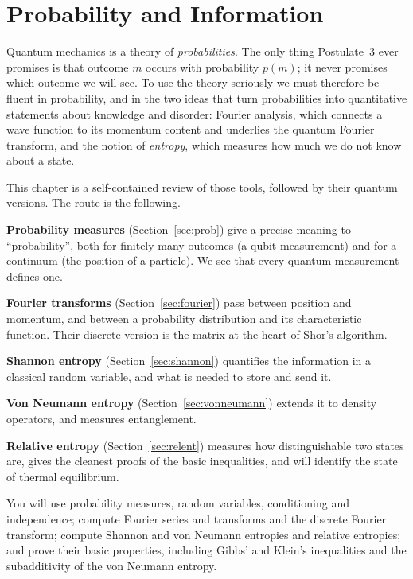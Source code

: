 \chapter{Probability and Information}\label{ch:info}

Quantum mechanics is a theory of \emph{probabilities}. The only thing Postulate~3 ever promises is that outcome $m$ occurs with probability $p(m)$; it never promises which outcome we will see. To use the theory seriously we must therefore be fluent in probability, and in the two
ideas that turn probabilities into quantitative statements about knowledge and disorder: Fourier analysis, which connects a wave function to its momentum content and underlies the quantum Fourier transform, and the notion of \emph{entropy}, which measures how much we do not know about a state.

This chapter is a self-contained review of those tools, followed by their quantum versions. The route is the following.

\begin{steps}
  \item \textbf{Probability measures} (Section~\ref{sec:prob}) give a precise meaning to ``probability'', both for finitely many outcomes (a qubit measurement) and for a continuum (the position of a particle). We see that every quantum measurement defines one.
  \item \textbf{Fourier transforms} (Section~\ref{sec:fourier}) pass between position and momentum, and between a probability distribution and its characteristic function. Their discrete version is the matrix at the heart of Shor's algorithm.
  \item \textbf{Shannon entropy} (Section~\ref{sec:shannon}) quantifies the information in a classical random variable, and what is needed to store and send it.
  \item \textbf{Von Neumann entropy} (Section~\ref{sec:vonneumann}) extends it to density operators, and measures entanglement.
  \item \textbf{Relative entropy} (Section~\ref{sec:relent}) measures how distinguishable two states are, gives the cleanest proofs of the basic inequalities, and will identify the state of thermal equilibrium.
\end{steps}

\begin{objectives}
  You will use probability measures, random variables, conditioning and independence; compute Fourier series and transforms and the discrete Fourier transform; compute Shannon and von Neumann entropies and relative entropies; and prove
  their basic properties, including Gibbs' and Klein's inequalities and the subadditivity of the von Neumann entropy.
\end{objectives}


